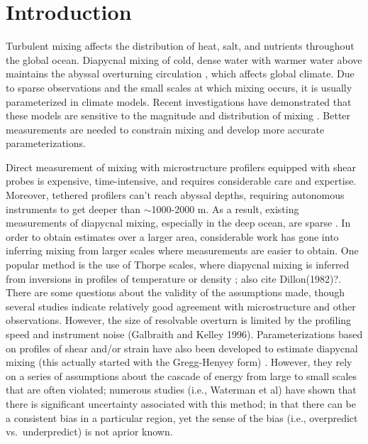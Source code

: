 \documentclass{ametsoc}
\begin{document}


\section{Introduction}

Turbulent mixing affects the distribution of heat, salt, and nutrients throughout the global ocean. Diapycnal mixing  of cold, dense water with warmer water above maintains the abyssal overturning circulation \cite{munk66,munkwunsch98}, which affects global climate. Due to sparse observations and the small scales at which mixing occurs, it is usually parameterized in climate models. Recent investigations have demonstrated that these models are sensitive to the magnitude and distribution of mixing \cite{meletetal13}. Better measurements are needed to constrain mixing and develop more accurate parameterizations.

Direct measurement of mixing with microstructure profilers equipped with shear probes is expensive, time-intensive, and requires considerable care and expertise. Moreover, tethered profilers can't reach abyssal depths, requiring autonomous instruments to get deeper than $\sim$1000-2000 m.  As a result, existing measurements of diapycnal mixing, especially in the deep ocean,  are sparse \cite{waterhouseetal14}. In order to obtain estimates over a larger area, considerable work has gone into inferring mixing from larger scales where measurements are easier to obtain. One popular method is the use of Thorpe scales, where diapycnal mixing is inferred from inversions in profiles of temperature or density  \cite{thorpe77}; also cite Dillon(1982)?. There are some questions about the validity of the assumptions made, though several studies indicate relatively good agreement with microstructure and other observations. However, the size of resolvable overturn is limited by the profiling speed and instrument noise (Galbraith and Kelley 1996). Parameterizations based on profiles of shear and/or strain have also been developed to estimate diapycnal mixing (this actually started with the Gregg-Henyey form) \cite{kunzeetal06,polzinetal13,whalenetal12,whalenetal15}.  However, they rely on a series of assumptions about the cascade of energy from large to small scales that are often violated; numerous studies (i.e., Waterman et al) have shown that there is significant uncertainty associated with this method; in that there can be a consistent bias in a particular region, yet the sense of the bias (i.e., overpredict vs.\ underpredict) is not aprior known.  
\end{document}
